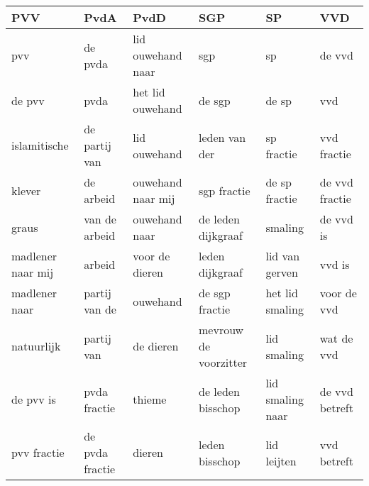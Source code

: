 \begin{tabular}{llllll}
\toprule
               PVV &             PvdA &               PvdD &                    SGP &                SP &             VVD \\
\midrule
               pvv &          de pvda &  lid ouwehand naar &                    sgp &                sp &          de vvd \\
            de pvv &             pvda &   het lid ouwehand &                 de sgp &             de sp &             vvd \\
      islamitische &    de partij van &       lid ouwehand &          leden van der &        sp fractie &     vvd fractie \\
            klever &        de arbeid &  ouwehand naar mij &            sgp fractie &     de sp fractie &  de vvd fractie \\
             graus &    van de arbeid &      ouwehand naar &     de leden dijkgraaf &           smaling &       de vvd is \\
 madlener naar mij &           arbeid &     voor de dieren &        leden dijkgraaf &    lid van gerven &          vvd is \\
     madlener naar &    partij van de &           ouwehand &         de sgp fractie &   het lid smaling &     voor de vvd \\
        natuurlijk &       partij van &          de dieren &  mevrouw de voorzitter &       lid smaling &      wat de vvd \\
         de pvv is &     pvda fractie &             thieme &      de leden bisschop &  lid smaling naar &  de vvd betreft \\
       pvv fractie &  de pvda fractie &             dieren &         leden bisschop &       lid leijten &     vvd betreft \\
\bottomrule
\end{tabular}
